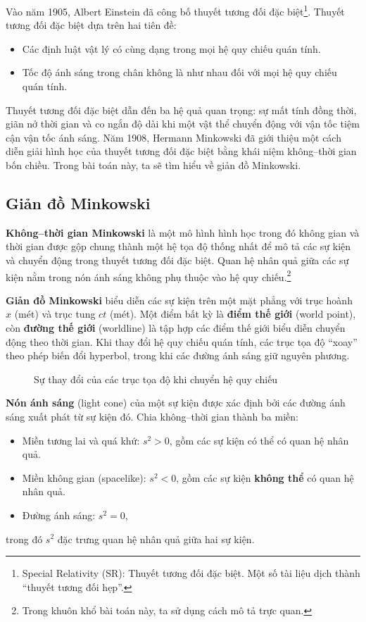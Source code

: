 Vào năm 1905, Albert Einstein đã công bố thuyết tương đối đặc biệt\footnote{Special Relativity (SR): Thuyết tương đối đặc biệt. Một số tài liệu dịch thành ``thuyết tương đối hẹp''.}. Thuyết tương đối đặc biệt dựa trên hai tiên đề:
\begin{itemize}
    \item Các định luật vật lý có cùng dạng trong mọi hệ quy chiếu quán tính.
    \item Tốc độ ánh sáng trong chân không là như nhau đối với mọi hệ quy chiếu quán tính.
\end{itemize}
Thuyết tương đối đặc biệt dẫn đến ba hệ quả quan trọng: sự mất tính đồng thời, giãn nở thời gian và co ngắn độ dài khi một vật thể chuyển động với vận tốc tiệm cận vận tốc ánh sáng. Năm 1908, Hermann Minkowski đã giới thiệu một cách diễn giải hình học của thuyết tương đối đặc biệt bằng khái niệm không--thời gian bốn chiều. Trong bài toán này, ta sẽ tìm hiểu về giản đồ Minkowski.

\vspace{8pt}

\subsection*{Giản đồ Minkowski}

\textbf{Không--thời gian Minkowski} là một mô hình hình học trong đó không gian và thời gian được gộp chung thành một hệ tọa độ thống nhất để mô tả các sự kiện và chuyển động trong thuyết tương đối đặc biệt. Quan hệ nhân quả giữa các sự kiện nằm trong nón ánh sáng không phụ thuộc vào hệ quy chiếu.\footnote{Trong khuôn khổ bài toán này, ta sử dụng cách mô tả trực quan.}

\vspace{8pt}

\textbf{Giản đồ Minkowski} biểu diễn các sự kiện trên một mặt phẳng với trục hoành \(x\) (mét) và trục tung \(ct\) (mét). Một điểm bất kỳ là \textbf{điểm thế giới} (world point), còn \textbf{đường thế giới} (worldline) là tập hợp các điểm thế giới biểu diễn chuyển động theo thời gian. Khi thay đổi hệ quy chiếu quán tính, các trục tọa độ ``xoay'' theo phép biến đổi hyperbol, trong khi các đường ánh sáng giữ nguyên phương.

\begin{figure}[h!]
\centering

\caption{Sự thay đổi của các trục tọa độ khi chuyển hệ quy chiếu}
\end{figure}

\textbf{Nón ánh sáng} (light cone) của một sự kiện được xác định bởi các đường ánh sáng xuất phát từ sự kiện đó. Chia không--thời gian thành ba miền:
\begin{itemize}
    \item Miền tương lai và quá khứ: \(s^2>0\), gồm các sự kiện có thể có quan hệ nhân quả.
    \item Miền không gian (spacelike): \(s^2<0\), gồm các sự kiện \textbf{không thể} có quan hệ nhân quả.
    \item Đường ánh sáng: \(s^2=0\),
\end{itemize}
trong đó \(s^2\) đặc trưng quan hệ nhân quả giữa hai sự kiện.


